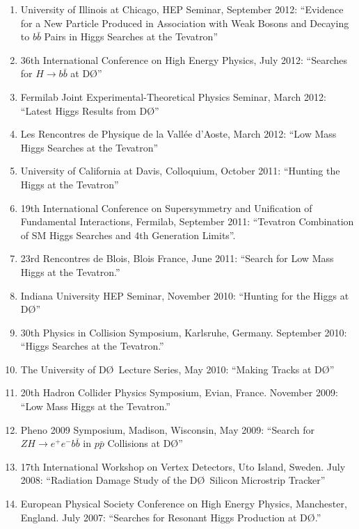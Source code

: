 \documentclass[amsmath,amssymb]{revtex4}
\def\dzero{D\O}
\begin{document}
\begin{enumerate}
\item University of Illinois at Chicago, HEP Seminar, September 2012:
``Evidence for a New Particle Produced in Association with Weak Bosons 
  and Decaying to $b\bar{b}$ Pairs in Higgs Searches at the Tevatron''
\item 36th International Conference on High Energy Physics, July 2012:
``Searches for $H\to b\bar{b}$ at \dzero''
\item Fermilab Joint Experimental-Theoretical Physics Seminar, March 2012:
``Latest Higgs Results from \dzero''
\item Les Rencontres de Physique de la Vallée d'Aoste, March 2012:
``Low Mass Higgs Searches at the Tevatron''
\item University of California at Davis, Colloquium, October 2011:
``Hunting the Higgs at the Tevatron''
\item 19th International Conference on Supersymmetry and Unification of Fundamental Interactions,
Fermilab, September 2011:
``Tevatron Combination of SM Higgs Searches and 4th Generation Limits''.
\item 23rd Rencontres de Blois, Blois France, June 2011:
``Search for Low Mass Higgs at the Tevatron.''
\item Indiana University HEP Seminar, November 2010:
``Hunting for the Higgs at \dzero''
\item 30th Physics in Collision Symposium, Karlsruhe, Germany.  September 2010:
``Higgs Searches at the Tevatron.''
\item The University of \dzero~Lecture Series, May 2010: ``Making Tracks at \dzero''
\item 20th Hadron Collider Physics Symposium, Evian, France. November 2009:
``Low Mass Higgs at the Tevatron.''
\item Pheno 2009 Symposium, Madison, Wisconsin, May 2009: 
``Search for $ZH\to e^+e^-b{\bar b}$ in $p\bar{p}$ Collisions at \dzero''
\item 17th International Workshop on Vertex Detectors, Uto Island, Sweden.  July 2008:
``Radiation Damage Study of the \dzero\ Silicon Microstrip Tracker''
\item European Physical Society Conference on High Energy Physics, Manchester, England.  July 2007:
``Searches for Resonant Higgs Production at \dzero.''
\end{enumerate}
\end{document}
